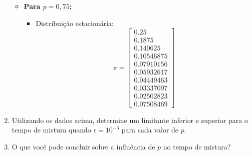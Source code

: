 \begin{enumerate}
\begin{resposta}
\begin{itemize}
            \newpage
            \item \textbf{Para $p = 0{,}75$:}
            \begin{itemize}
                \item Distribuição estacionária:
                $$
                \pi = 
                \begin{bmatrix}
                0.25 \\
                0.1875 \\
                0.140625 \\
                0.10546875 \\
                0.07910156 \\
                0.05932617 \\
                0.04449463 \\
                0.03337097 \\
                0.02502823 \\
                0.07508469
                \end{bmatrix}
                $$
            \end{itemize}
        \end{itemize}



    \end{resposta}
    \item Utilizando os dados acima, determine um limitante inferior e superior para o tempo de mistura quando $\epsilon = 10^{-6}$ para cada valor de $p$.
    \begin{resposta}

    \end{resposta}
    \item O que você pode concluir sobre a influência de $p$ no tempo de mistura?
    \begin{resposta}

    \end{resposta}
\end{enumerate}

